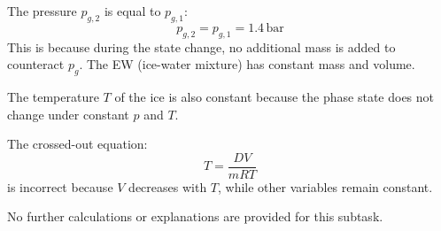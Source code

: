 The pressure \( p_{g,2} \) is equal to \( p_{g,1} \):  
\[
p_{g,2} = p_{g,1} = 1.4 \, \text{bar}
\]  
This is because during the state change, no additional mass is added to counteract \( p_{g} \). The EW (ice-water mixture) has constant mass and volume.  

The temperature \( T \) of the ice is also constant because the phase state does not change under constant \( p \) and \( T \).  

The crossed-out equation:  
\[
T = \frac{DV}{mRT}
\]  
is incorrect because \( V \) decreases with \( T \), while other variables remain constant.  

No further calculations or explanations are provided for this subtask.